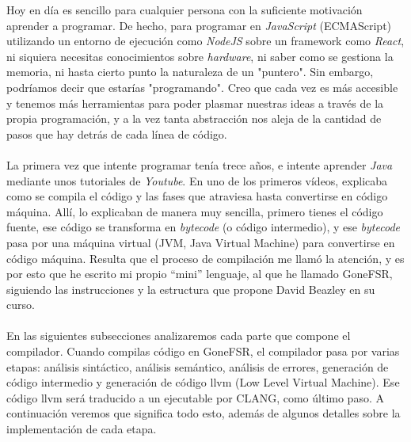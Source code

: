 
Hoy en día es sencillo para cualquier persona con la suficiente motivación aprender a programar. De hecho, para programar en \textit{JavaScript} (ECMAScript) utilizando un entorno de ejecución como \textit{NodeJS} sobre un framework como \textit{React}, ni siquiera necesitas conocimientos sobre \textit{hardware}, ni saber como se gestiona la memoria, ni hasta cierto punto la naturaleza de un "puntero". Sin embargo, podríamos decir que estarías "programando". Creo que cada vez es más accesible y tenemos más herramientas para poder plasmar nuestras ideas a través de la propia programación, y a la vez tanta abstracción nos aleja de la cantidad de pasos que hay detrás de cada línea de código.\\\\
La primera vez que intente programar tenía trece años, e intente aprender \textit{Java} mediante unos tutoriales de \textit{Youtube}. En uno de los primeros vídeos, explicaba como se compila el código y las fases que atraviesa hasta convertirse en código máquina. Allí, lo explicaban de manera muy sencilla, primero tienes el código fuente, ese código se transforma en \textit{bytecode} (o código intermedio), y ese \textit{bytecode} pasa por una máquina virtual (JVM, Java Virtual Machine) para convertirse en código máquina. Resulta que el proceso de compilación me llamó la atención, y es por esto que he escrito mi propio ``mini''  lenguaje, al que he llamado GoneFSR, siguiendo las instrucciones y la estructura que propone David Beazley en su curso.\\\\
En las siguientes subsecciones analizaremos cada parte que compone el compilador. Cuando compilas código en GoneFSR, el compilador pasa por varias etapas: análisis sintáctico, análisis semántico, análisis de errores, generación de código intermedio y generación de código llvm (Low Level Virtual Machine). Ese código llvm será traducido a un ejecutable por CLANG, como último paso. A continuación veremos que significa todo esto, además de algunos detalles sobre la implementación de cada etapa.
